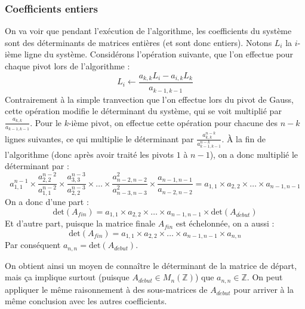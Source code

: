 \documentclass[french]{article}
\begin{document}
\subsubsection{Coefficients entiers}
On va voir que pendant l'exécution de l'algorithme, les coefficients du système sont des déterminants de matrices entières (et sont donc entiers).
Notons $L_i$ la $i$-ième ligne du système. Considérons l'opération suivante, que l'on effectue pour chaque pivot lors de l'algorithme :
$$L_i \gets \frac{a_{k,k} L_i - a_{i,k} L_k}{a_{k-1,k-1}}$$
Contrairement à la simple tranvection que l'on effectue lors du pivot de Gauss, cette opération modifie le déterminant du système, qui se voit multiplié par $\frac{a_{k,k}}{a_{k-1,k-1}}$.
Pour le $k$-ième pivot, on effectue cette opération pour chacune des $n-k$ lignes suivantes, ce qui multiplie le déterminant par $\frac{a_{k,k}^{n-k}}{a_{k-1,k-1}^{n-k}}$.
À la fin de l'algorithme (donc après avoir traité les pivots $1$ à $n-1$), on a donc multiplié le déterminant par :
$$a_{1,1}^{n-1} \times \frac{a_{2,2}^{n-2}}{a_{1,1}^{n-2}} \times \frac{a_{3,3}^{n-3}}{a_{2,2}^{n-3}} \times \hdots \times \frac{a_{n-2,n-2}^2}{a_{n-3,n-3}^2} \times \frac{a_{n-1,n-1}}{a_{n-2,n-2}} = a_{1,1} \times a_{2,2} \times \hdots \times a_{n-1,n-1}$$
On a donc d'une part :
$$\mbox{det}(A_{fin}) = a_{1,1} \times a_{2,2} \times \hdots \times a_{n-1,n-1} \times \mbox{det}(A_{d\acute{e}but})$$
Et d'autre part, puisque la matrice finale $A_{fin}$ est échelonnée, on a aussi :
$$\mbox{det}(A_{fin}) = a_{1,1} \times a_{2,2} \times \hdots \times a_{n-1,n-1} \times a_{n,n}$$
Par conséquent $a_{n,n} = \mbox{det}(A_{d\acute{e}but})$.
\par
On obtient ainsi un moyen de connaître le déterminant de la matrice de départ, mais ça implique surtout (puisque $A_{d\acute{e}but} \in M_n(\mathbb{Z})$) que $a_{n,n} \in \mathbb{Z}$. On peut appliquer le même raisonnement à des sous-matrices de $A_{d\acute{e}but}$ pour 	arriver à la même conclusion avec les autres coefficients.  
\end{document}
